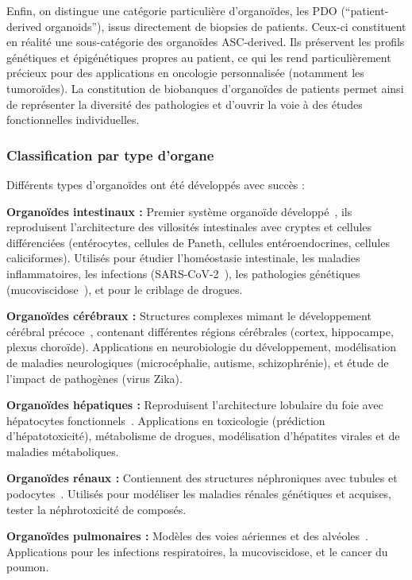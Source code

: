 Enfin, on distingue une catégorie particulière d'organoïdes, les PDO (``patient-derived organoids''), issus directement de biopsies de patients. Ceux-ci constituent en réalité une sous-catégorie des organoïdes ASC-derived. Ils préservent les profils génétiques et épigénétiques propres au patient, ce qui les rend particulièrement précieux pour des applications en oncologie personnalisée (notamment les tumoroïdes). La constitution de biobanques d'organoïdes de patients permet ainsi de représenter la diversité des pathologies et d'ouvrir la voie à des études fonctionnelles individuelles.

\subsubsection{Classification par type d'organe}

Différents types d'organoïdes ont été développés avec succès :

\textbf{Organoïdes intestinaux :}
Premier système organoïde développé~\cite{Sato2009}, ils reproduisent l'architecture des villosités intestinales avec cryptes et cellules différenciées (entérocytes, cellules de Paneth, cellules entéroendocrines, cellules caliciformes). Utilisés pour étudier l'homéostasie intestinale, les maladies inflammatoires, les infections (SARS-CoV-2~\cite{Zhou2020COVID}), les pathologies génétiques (mucoviscidose~\cite{Dekkers2013}), et pour le criblage de drogues.

\textbf{Organoïdes cérébraux :}
Structures complexes mimant le développement cérébral précoce~\cite{Lancaster2013}, contenant différentes régions cérébrales (cortex, hippocampe, plexus choroïde). Applications en neurobiologie du développement, modélisation de maladies neurologiques (microcéphalie, autisme, schizophrénie), et étude de l'impact de pathogènes (virus Zika).

\textbf{Organoïdes hépatiques :}
Reproduisent l'architecture lobulaire du foie avec hépatocytes fonctionnels~\cite{Huch2015}. Applications en toxicologie (prédiction d'hépatotoxicité), métabolisme de drogues, modélisation d'hépatites virales et de maladies métaboliques.

\textbf{Organoïdes rénaux :}
Contiennent des structures néphroniques avec tubules et podocytes~\cite{Takasato2015}. Utilisés pour modéliser les maladies rénales génétiques et acquises, tester la néphrotoxicité de composés.

\textbf{Organoïdes pulmonaires :}
Modèles des voies aériennes et des alvéoles~\cite{Sachs2019}. Applications pour les infections respiratoires, la mucoviscidose, et le cancer du poumon.

